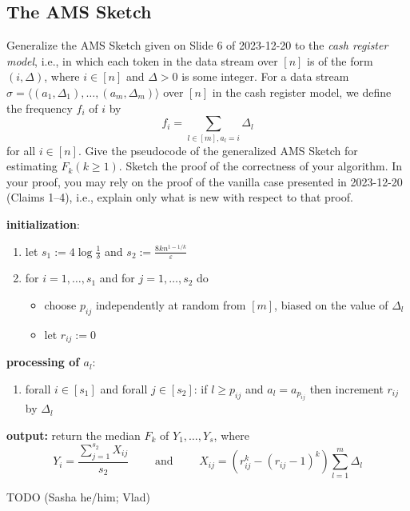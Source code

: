 \documentclass{article}
\let\epsilon\varepsilon
\begin{document}
  \subsection{The AMS Sketch}
  \begin{centerframebox}
    Generalize the AMS Sketch given on Slide 6 of 2023-12-20 to the \textit{cash register model},
    i.e., in which each token in the data stream over $[n]$ is of the
    form $(i, \Delta)$, where $i \in [n]$ and $\Delta > 0$ is some integer.
    For a data stream $\sigma = \langle(a_1, \Delta_1), \dots ,(a_m, \Delta_m)\rangle$ over $[n]$ in the cash register model, we define the
    frequency $f_i$ of $i$ by
    \[ f_i = \sum_{l\in[m],a_l=i} \Delta_l \]
    for all $i \in [n]$. Give the pseudocode of the generalized AMS Sketch for estimating
    $F_k (k \geq 1)$. Sketch the proof of the correctness of your algorithm. In your proof,
    you may rely on the proof of the vanilla case presented in 2023-12-20 (Claims 1--4),
    i.e., explain only what is new with respect to that proof.
  \end{centerframebox}

  \noindent
  \textbf{initialization}:
  \begin{enumerate}[topsep=0pt,itemsep=-1ex,partopsep=1ex,parsep=1ex]
    \item let $s_1 := 4 \log \frac{1}{\delta}$ and $s_2 := \frac{8kn^{1-1/k}}{\epsilon}$
    \item for $i = 1,\dots, s_1$ and for $j = 1,\dots, s_2$ do
    \begin{itemize}[topsep=0pt,itemsep=-1ex,partopsep=1ex,parsep=1ex]
      \item choose $p_{ij}$ independently at random from $[m]$, biased on the value of $\Delta_l$
      \item let $r_{ij} := 0$
    \end{itemize}
  \end{enumerate}
  \textbf{processing of $a_l$}:
  \begin{enumerate}[topsep=0pt,itemsep=-1ex,partopsep=1ex,parsep=1ex]
    \item forall $i \in [s_1]$ and forall $j \in [s_2]$: if $l \geq p_{ij}$ and $a_l = a_{p_{ij}}$ then increment $r_{ij}$ by $\Delta_l$
  \end{enumerate}
  \textbf{output:} return the median $F_k$ of $Y_1,\dots, Y_s$, where
  \[ Y_{i}=\frac{\sum_{j=1}^{s_{2}}X_{i j}}{s_{2}} \qquad\text{ and }\qquad
   X_{i j} = \left(r_{i j}^{k}-\left(r_{i j} - 1\right)^{k}\right) \sum_{l=1}^m \Delta_l \]

  TODO (Sasha he/him; Vlad)
\end{document}
